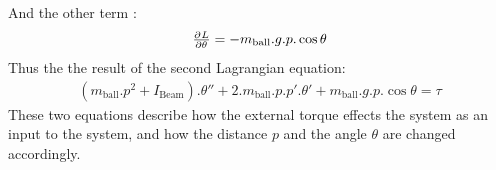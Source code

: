 \documentclass{article}
\begin{document}
And the other term :
\begin{equation}
	\begin{split}
		\pd{L}{\theta} = -m_{\text{ball}}.g.p.\cos{\theta}
	\end{split}
\end{equation}
Thus the the result of the second Lagrangian equation:
\begin{equation}
	\begin{split}
		(m_{\text{ball}}.p^2 + I_{\text{Beam}}).\theta'' + 2.m_{\text{ball}}.p.p'.\theta' + m_{\text{ball}}.g.p.\cos{\theta} = \tau
	\end{split}
\end{equation}
These two equations describe how the external torque effects the system as an input to the system, and how the distance $p$ and the angle $\theta$ are changed accordingly.
\newpage
\end{document}
